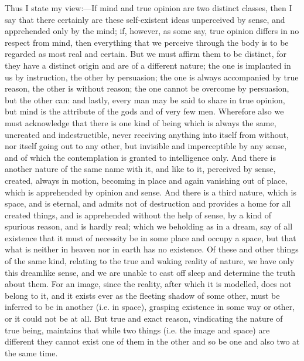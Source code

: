 \documentclass[11pt,letter]{article}
\begin{document}
\par  Thus I state my view:—If mind and true opinion are two distinct classes, then I say that there certainly are these self-existent ideas unperceived by sense, and apprehended only by the mind; if, however, as some say, true opinion differs in no respect from mind, then everything that we perceive through the body is to be regarded as most real and certain. But we must affirm them to be distinct, for they have a distinct origin and are of a different nature; the one is implanted in us by instruction, the other by persuasion; the one is always accompanied by true reason, the other is without reason; the one cannot be overcome by persuasion, but the other can: and lastly, every man may be said to share in true opinion, but mind is the attribute of the gods and of very few men. Wherefore also we must acknowledge that there is one kind of being which is always the same, uncreated and indestructible, never receiving anything into itself from without, nor itself going out to any other, but invisible and imperceptible by any sense, and of which the contemplation is granted to intelligence only. And there is another nature of the same name with it, and like to it, perceived by sense, created, always in motion, becoming in place and again vanishing out of place, which is apprehended by opinion and sense. And there is a third nature, which is space, and is eternal, and admits not of destruction and provides a home for all created things, and is apprehended without the help of sense, by a kind of spurious reason, and is hardly real; which we beholding as in a dream, say of all existence that it must of necessity be in some place and occupy a space, but that what is neither in heaven nor in earth has no existence. Of these and other things of the same kind, relating to the true and waking reality of nature, we have only this dreamlike sense, and we are unable to cast off sleep and determine the truth about them. For an image, since the reality, after which it is modelled, does not belong to it, and it exists ever as the fleeting shadow of some other, must be inferred to be in another (i.e. in space), grasping existence in some way or other, or it could not be at all. But true and exact reason, vindicating the nature of true being, maintains that while two things (i.e. the image and space) are different they cannot exist one of them in the other and so be one and also two at the same time.
\end{document}
